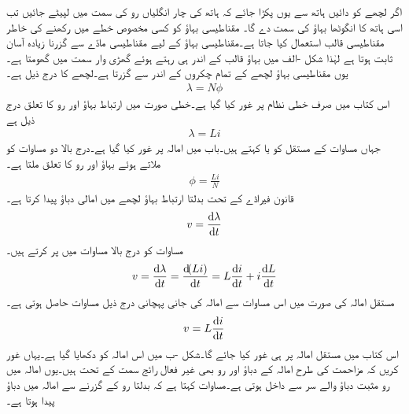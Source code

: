 اگر لچھے کو دائیں ہاتھ سے یوں پکڑا جائے کہ ہاتھ کی چار انگلیاں رو کی سمت میں لپیٹے جائیں تب اسی ہاتھ کا انگوٹھا بہاؤ کی سمت دے گا۔
مقناطیسی بہاؤ کو کسی مخصوص خطے میں رکھنے کی خاطر مقناطیسی قالب استعمال کیا جاتا ہے۔مقناطیسی بہاؤ کے لیے مقناطیسی مادّے سے گزرنا زیادہ آسان ثابت ہوتا ہے لہٰذا شکل -الف میں بہاؤ قالب کے اندر ہی رہتے ہوئے گھڑی وار  سمت میں گھومتا ہے۔یوں مقناطیسی بہاؤ  لچھے کے تمام چکروں کے اندر سے گزرتا ہے۔لچھے کا   درج ذیل ہے۔
\begin{align}\label{مساوات_مشترک_ارتباط_بہاو_الف}
\lambda=N \phi
\end{align}
اس کتاب میں صرف خطی نظام پر غور کیا گیا ہے۔خطی صورت میں ارتباط بہاؤ اور رو کا تعلق درج ذیل ہے
\begin{align}\label{مساوات_مشترک_ارتباط_بہاو_ب}
\lambda=L i
\end{align}
جہاں مساوات کے مستقل  کو  یا  کہتے ہیں۔باب  میں امالہ پر غور کیا گیا ہے۔درج بالا دو مساوات کو ملاتے ہوئے  بہاؤ اور رو کا تعلق ملتا ہے۔
\begin{align}
\phi=\frac{Li}{N}
\end{align}
قانون فیراڈے کے تحت بدلتا ارتباط بہاؤ لچھے میں امالی دباؤ پیدا کرتا ہے۔
\begin{align}
v=\frac{\dif \lambda}{\dif t}
\end{align}
مساوات  کو درج بالا مساوات میں پر کرتے ہیں۔
\begin{align*}
v=\frac{\dif \lambda}{\dif t}=\frac{\dif (Li)}{\dif t}=L\frac{\dif i}{\dif t}+i\frac{\dif L}{\dif t}
\end{align*}
مستقل امالہ کی صورت میں اس مساوات سے امالہ کی جانی پہچانی درج ذیل مساوات حاصل ہوتی ہے۔
\begin{align}\label{مساوات_مقناطیسی_امالہ_کی_مساوات}
v=L\frac{\dif i}{\dif t}
\end{align}
اس کتاب میں مستقل امالہ پر ہی غور کیا جائے گا۔شکل -ب میں اس امالہ کو دکھایا گیا ہے۔یہاں غور کریں کہ مزاحمت کی طرح امالہ کے دباؤ اور رو بھی غیر فعال رائج سمت کے تحت ہیں۔یوں امالہ میں رو مثبت دباؤ والے سر سے داخل ہوتی ہے۔مساوات  کہتا ہے کہ  بدلتا رو کے گزرنے سے امالہ میں دباؤ پیدا ہوتا ہے۔
%
